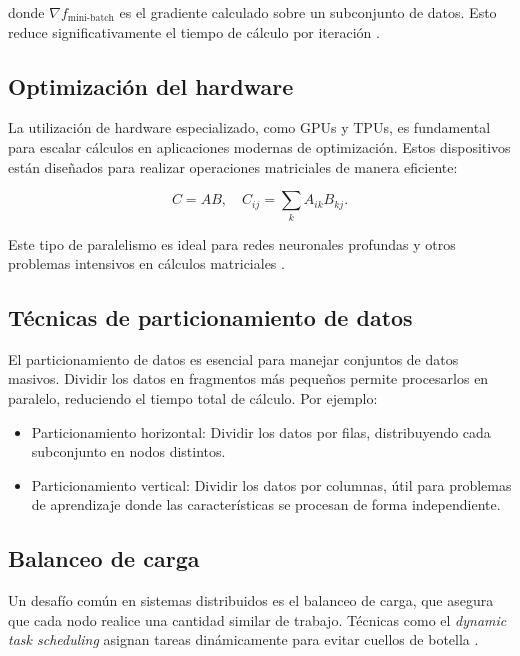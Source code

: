 \begin{itemize}
		donde \(\nabla f_{\text{mini-batch}}\) es el gradiente calculado sobre un subconjunto de datos. Esto reduce significativamente el tiempo de cálculo por iteración \cite{goodfellow2016deep}.
		
		\subsection{Optimización del hardware}
		
		La utilización de hardware especializado, como GPUs y TPUs, es fundamental para escalar cálculos en aplicaciones modernas de optimización. Estos dispositivos están diseñados para realizar operaciones matriciales de manera eficiente:
		
		\begin{equation}
			C = AB, \quad C_{ij} = \sum_k A_{ik} B_{kj}.
		\end{equation}
		
		Este tipo de paralelismo es ideal para redes neuronales profundas y otros problemas intensivos en cálculos matriciales \cite{jouppi2017tpu}.
		
		\subsection{Técnicas de particionamiento de datos}
		
		El particionamiento de datos es esencial para manejar conjuntos de datos masivos. Dividir los datos en fragmentos más pequeños permite procesarlos en paralelo, reduciendo el tiempo total de cálculo. Por ejemplo:
		
		\begin{itemize}
			\item Particionamiento horizontal: Dividir los datos por filas, distribuyendo cada subconjunto en nodos distintos.
			\item Particionamiento vertical: Dividir los datos por columnas, útil para problemas de aprendizaje donde las características se procesan de forma independiente.
		\end{itemize}
		
		\subsection{Balanceo de carga}
		
		Un desafío común en sistemas distribuidos es el balanceo de carga, que asegura que cada nodo realice una cantidad similar de trabajo. Técnicas como el \textit{dynamic task scheduling} asignan tareas dinámicamente para evitar cuellos de botella \cite{zaharia2010spark}.
		

\end{itemize}
